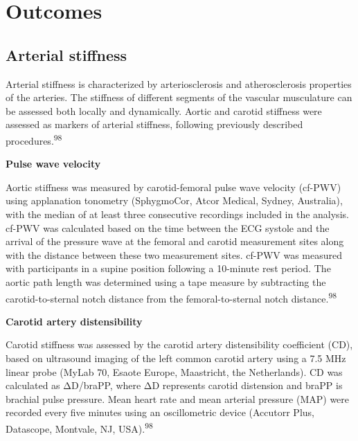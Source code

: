 \documentclass[
  a4paper,
  headsepline=true,
  open=left]{scrbook}
\begin{document}
\hypertarget{outcomes}{%
\section{Outcomes}\label{outcomes}}

\hypertarget{arterial-stiffness}{%
\subsection{Arterial stiffness}\label{arterial-stiffness}}

Arterial stiffness is characterized by arteriosclerosis and
atherosclerosis properties of the arteries. The stiffness of different
segments of the vascular musculature can be assessed both locally and
dynamically. Aortic and carotid stiffness were assessed as markers of
arterial stiffness, following previously described
procedures.\textsuperscript{98}

\textbf{Pulse wave velocity}

Aortic stiffness was measured by carotid-femoral pulse wave velocity
(cf-PWV) using applanation tonometry (SphygmoCor, Atcor Medical, Sydney,
Australia), with the median of at least three consecutive recordings
included in the analysis. cf-PWV was calculated based on the time
between the ECG systole and the arrival of the pressure wave at the
femoral and carotid measurement sites along with the distance between
these two measurement sites. cf-PWV was measured with participants in a
supine position following a 10-minute rest period. The aortic path
length was determined using a tape measure by subtracting the
carotid-to-sternal notch distance from the femoral-to-sternal notch
distance.\textsuperscript{98}

\textbf{Carotid artery distensibility}

Carotid stiffness was assessed by the carotid artery distensibility
coefficient (CD), based on ultrasound imaging of the left common carotid
artery using a 7.5 MHz linear probe (MyLab 70, Esaote Europe,
Maastricht, the Netherlands). CD was calculated as ΔD/braPP, where ΔD
represents carotid distension and braPP is brachial pulse pressure. Mean
heart rate and mean arterial pressure (MAP) were recorded every five
minutes using an oscillometric device (Accutorr Plus, Datascope,
Montvale, NJ, USA).\textsuperscript{98}
\end{document}
